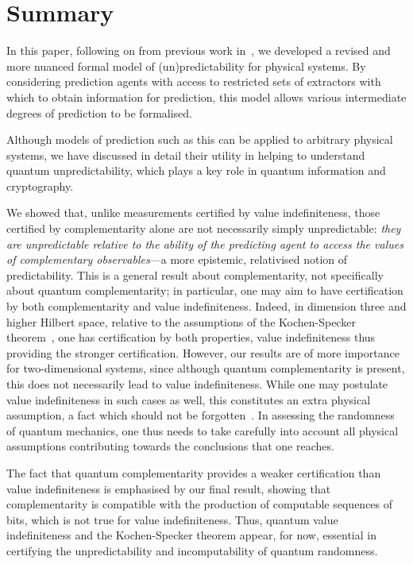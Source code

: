 \documentclass[information,article,submit,moreauthors,pdftex,12pt,a4paper]{mdpi}
\theoremstyle{mdpi}
\newcounter{ex}
\newcounter{re}
\theoremstyle{mdpidefinition}
\begin{document}
\section{Summary}

In this paper, following on from previous work in~\cite{DBLP:conf/birthday/AbbottCS15}, we developed a revised and more nuanced formal model of (un)predictability for physical systems.
By considering prediction agents with access to restricted sets of extractors with which to obtain information for prediction, this model allows various intermediate degrees of prediction to be formalised.

Although models of prediction such as this can be applied to arbitrary physical systems, we have discussed in detail their utility in helping to understand quantum unpredictability, which plays a key role in quantum information and cryptography.

We showed that, unlike measurements certified by value indefiniteness, those certified by complementarity alone are not necessarily simply unpredictable: \emph{they are unpredictable relative to the ability of the predicting agent to access the values of complementary observables}---a more epistemic, relativised notion of predictability.
This is a general result about complementarity, not specifically about %
quantum complementarity; in particular, one may aim to have certification by both complementarity and value indefiniteness.
Indeed, in dimension three and higher Hilbert space, relative to the assumptions of the Kochen-Specker theorem~\cite{2012-incomput-proofsCJ}, one has certification by both properties, value indefiniteness thus providing the stronger certification.
However, our results are of more importance for two-dimensional systems, since although quantum complementarity is present, this does not necessarily lead to value indefiniteness.
While one may postulate value indefiniteness in such cases as well, this constitutes an extra physical assumption, a fact which should not be forgotten~\cite{DBLP:conf/birthday/AbbottCS15}.
In assessing the randomness of quantum mechanics, one thus needs to take carefully into account all physical assumptions contributing towards the conclusions that one reaches.

The fact that quantum complementarity provides a weaker certification than value indefiniteness is emphasised by our final result, showing that complementarity is compatible with the production of computable sequences of bits, which is not true for value indefiniteness.
Thus, quantum value indefiniteness and the Kochen-Specker theorem appear, for now, essential in certifying the unpredictability and incomputability of quantum randomness.
\end{document}
